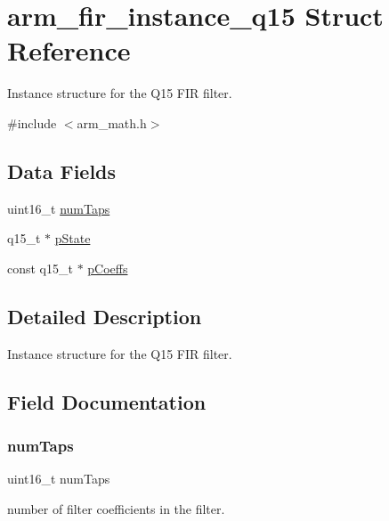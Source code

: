 \hypertarget{structarm__fir__instance__q15}{}\section{arm\+\_\+fir\+\_\+instance\+\_\+q15 Struct Reference}
\label{structarm__fir__instance__q15}


Instance structure for the Q15 F\+IR filter.  




{\ttfamily \#include $<$arm\+\_\+math.\+h$>$}

\subsection*{Data Fields}
\begin{DoxyCompactItemize}
\item 
uint16\+\_\+t \mbox{\hyperlink{structarm__fir__instance__q15_a751941891e47f522a7f5375fe8990aac}{num\+Taps}}
\item 
q15\+\_\+t $\ast$ \mbox{\hyperlink{structarm__fir__instance__q15_ae29dfdb736374fcddaeaec4b7770170c}{p\+State}}
\item 
const q15\+\_\+t $\ast$ \mbox{\hyperlink{structarm__fir__instance__q15_ae85d417edcdce57e9a54f8c841580578}{p\+Coeffs}}
\end{DoxyCompactItemize}


\subsection{Detailed Description}
Instance structure for the Q15 F\+IR filter. 

\subsection{Field Documentation}
\mbox{\label{structarm__fir__instance__q15_a751941891e47f522a7f5375fe8990aac}} 
\subsubsection{\texorpdfstring{numTaps}{numTaps}}
{\footnotesize\ttfamily uint16\+\_\+t num\+Taps}

number of filter coefficients in the filter. \mbox{\label{structarm__fir__instance__q15_ae85d417edcdce57e9a54f8c841580578}} 
